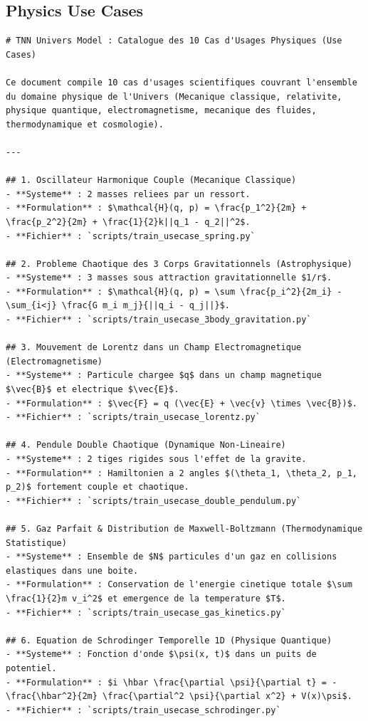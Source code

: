 \documentclass[11pt,a4paper]{article}
\begin{document}
\subsection{Physics Use Cases}
\begin{lstlisting}[language={}, caption={}, basicstyle=\ttfamily\footnotesize, breaklines=true]
# TNN Univers Model : Catalogue des 10 Cas d'Usages Physiques (Use Cases)

Ce document compile 10 cas d'usages scientifiques couvrant l'ensemble du domaine physique de l'Univers (Mecanique classique, relativite, physique quantique, electromagnetisme, mecanique des fluides, thermodynamique et cosmologie).

---

## 1. Oscillateur Harmonique Couple (Mecanique Classique)
- **Systeme** : 2 masses reliees par un ressort.
- **Formulation** : $\mathcal{H}(q, p) = \frac{p_1^2}{2m} + \frac{p_2^2}{2m} + \frac{1}{2}k||q_1 - q_2||^2$.
- **Fichier** : `scripts/train_usecase_spring.py`

## 2. Probleme Chaotique des 3 Corps Gravitationnels (Astrophysique)
- **Systeme** : 3 masses sous attraction gravitationnelle $1/r$.
- **Formulation** : $\mathcal{H}(q, p) = \sum \frac{p_i^2}{2m_i} - \sum_{i<j} \frac{G m_i m_j}{||q_i - q_j||}$.
- **Fichier** : `scripts/train_usecase_3body_gravitation.py`

## 3. Mouvement de Lorentz dans un Champ Electromagnetique (Electromagnetisme)
- **Systeme** : Particule chargee $q$ dans un champ magnetique $\vec{B}$ et electrique $\vec{E}$.
- **Formulation** : $\vec{F} = q (\vec{E} + \vec{v} \times \vec{B})$.
- **Fichier** : `scripts/train_usecase_lorentz.py`

## 4. Pendule Double Chaotique (Dynamique Non-Lineaire)
- **Systeme** : 2 tiges rigides sous l'effet de la gravite.
- **Formulation** : Hamiltonien a 2 angles $(\theta_1, \theta_2, p_1, p_2)$ fortement couple et chaotique.
- **Fichier** : `scripts/train_usecase_double_pendulum.py`

## 5. Gaz Parfait & Distribution de Maxwell-Boltzmann (Thermodynamique Statistique)
- **Systeme** : Ensemble de $N$ particules d'un gaz en collisions elastiques dans une boite.
- **Formulation** : Conservation de l'energie cinetique totale $\sum \frac{1}{2}m v_i^2$ et emergence de la temperature $T$.
- **Fichier** : `scripts/train_usecase_gas_kinetics.py`

## 6. Equation de Schrodinger Temporelle 1D (Physique Quantique)
- **Systeme** : Fonction d'onde $\psi(x, t)$ dans un puits de potentiel.
- **Formulation** : $i \hbar \frac{\partial \psi}{\partial t} = -\frac{\hbar^2}{2m} \frac{\partial^2 \psi}{\partial x^2} + V(x)\psi$.
- **Fichier** : `scripts/train_usecase_schrodinger.py`


\end{lstlisting}
\end{document}
